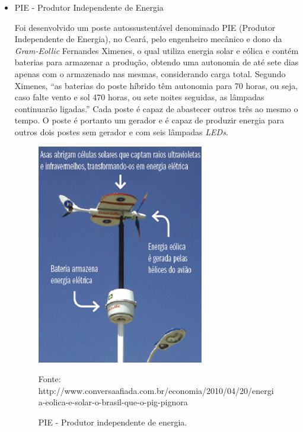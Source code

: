 \begin{itemize}
	\item PIE - Produtor Independente de Energia
	
	Foi desenvolvido um poste autossustentável denominado PIE (Produtor Independente de Energia), no Ceará, pelo engenheiro mecânico e dono da \textit{Gram-Eollic} Fernandes Ximenes, o qual utiliza energia solar e eólica e contém baterias para armazenar a produção, obtendo uma autonomia de até sete dias apenas com o armazenado nas mesmas, considerando carga total. Segundo Ximenes, “as baterias do poste híbrido têm autonomia para 70 horas, ou seja, caso falte vento e sol 470 horas, ou sete noites seguidas, as lâmpadas continuarão ligadas.” Cada poste é capaz de abastecer outros três ao mesmo o tempo. O poste é portanto um gerador e é capaz de produzir energia para outros dois postes sem gerador e com seis lâmpadas \textit{LEDs}. 
	
	\begin{figure}[H]
	 \centering
	\label{Produtor independente de energia}
	 \includegraphics[keepaspectratio=true,scale=0.8]{postes/1.png}
	 \caption{PIE - Produtor independente de energia.}
	 \small{Fonte: http://www.conversaafiada.com.br/economia/2010/04/20/energia-eolica-e-solar-o-brasil-que-o-pig-pignora}
	\end{figure}

\end{itemize}


